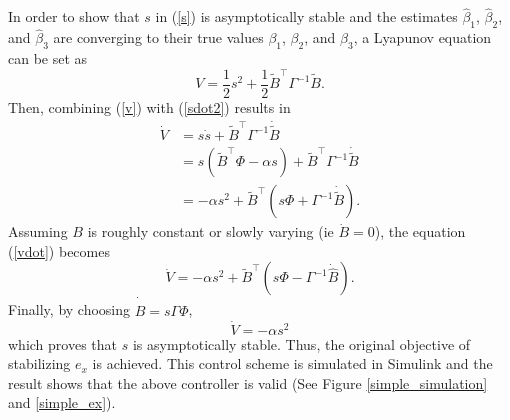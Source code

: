 In order to show that $s$ in (\ref{s}) is asymptotically stable and the estimates $\hat{\beta}_1$, $\hat{\beta}_2$, and $\hat{\beta}_3$ are converging to their true values $\beta_1$, $\beta_2$, and $\beta_3$, a Lyapunov equation can be set as
\begin{equation}
V=\frac{1}{2}s^2+\frac{1}{2}\tilde{B}^\top \Gamma^{-1}\tilde{B}.
\label{v}
\end{equation}
Then, combining (\ref{v}) with (\ref{sdot2}) results in
\begin{align}
\dot{V}&=s\dot{s}+\tilde{B}^\top \Gamma^{-1}\dot{\tilde{B}}
\\&=s(\tilde{B}^\top\Phi-\alpha s)+\tilde{B}^\top \Gamma^{-1}\dot{\tilde{B}}
\\&=-\alpha s^2+\tilde{B}^\top(s\Phi+\Gamma^{-1}\dot{\tilde{B}}).
\label{vdot}
\end{align}
Assuming $B$ is roughly constant or slowly varying (ie $\dot{B}=0$), the equation (\ref{vdot}) becomes 
\begin{equation}
\dot{V}=-\alpha s^2+\tilde{B}^\top(s\Phi-\Gamma^{-1}\dot{\hat{B}}).
\end{equation}
Finally, by choosing $\dot{\hat{B}}=s\Gamma\Phi$, 
\begin{equation}
\dot{V}=-\alpha s^2
\end{equation}
which proves that $s$ is asymptotically stable. Thus, the original objective of stabilizing $e_x$ is achieved. This control scheme is simulated in Simulink and the result shows that the above controller is valid (See Figure \ref{simple_simulation} and \ref{simple_ex}).

